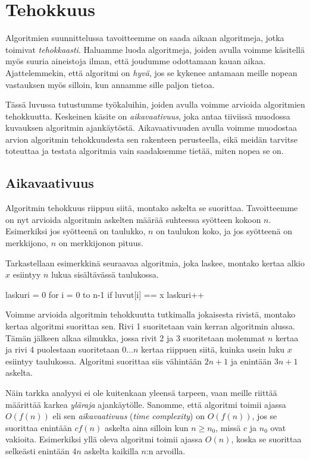 \chapter{Tehokkuus}

Algoritmien suunnittelussa tavoitteemme on saada aikaan
algoritmeja, jotka toimivat \emph{tehokkaasti}.
Haluamme luoda algoritmeja, joiden avulla voimme
käsitellä myös suuria aineistoja ilman, että joudumme
odottamaan kauan aikaa.
Ajattelemmekin, että algoritmi on \emph{hyvä},
jos se kykenee antamaan meille nopean vastauksen myös silloin,
kun annamme sille paljon tietoa.

Tässä luvussa tutustumme työkaluihin, joiden avulla
voimme arvioida algoritmien tehokkuutta.
Keskeinen käsite on \emph{aikavaativuus}, joka antaa
tiiviissä muodossa kuvauksen algoritmin ajankäytöstä.
Aikavaativuuden avulla voimme muodostaa arvion
algoritmin tehokkuudesta sen rakenteen perusteella,
eikä meidän tarvitse toteuttaa ja testata algoritmia
vain saadaksemme tietää, miten nopea se on.

\section{Aikavaativuus}


Algoritmin tehokkuus riippuu siitä, montako askelta se suorittaa.
Tavoitteemme on nyt arvioida algoritmin askelten määrää
suhteessa syötteen kokoon $n$.
Esimerkiksi jos syötteenä on taulukko,
$n$ on taulukon koko,
ja jos syötteenä on merkkijono,
$n$ on merkkijonon pituus.

Tarkastellaan esimerkkinä seuraavaa algoritmia,
joka laskee, montako kertaa alkio $x$ esiintyy
$n$ lukua sisältävässä taulukossa.

\begin{code}[numbers=left]
laskuri = 0
for i = 0 to n-1
    if luvut[i] == x
        laskuri++
\end{code}

Voimme arvioida algoritmin tehokkuutta tutkimalla
jokaisesta rivistä, montako kertaa algoritmi suorittaa sen.
Rivi 1 suoritetaan vain kerran algoritmin alussa.
Tämän jälkeen alkaa silmukka, jossa
rivit 2 ja 3 suoritetaan molemmat $n$ kertaa
ja rivi 4 puolestaan suoritetaan $0 \dots n$
kertaa riippuen siitä, kuinka usein
luku $x$ esiintyy taulukossa.
Algoritmi suorittaa siis vähintään $2n+1$ ja enintään $3n+1$
askelta.


Näin tarkka analyysi ei ole kuitenkaan yleensä tarpeen,
vaan meille riittää määrittää karkea \emph{yläraja} ajankäytölle.
Sanomme, että algoritmi toimii ajassa $O(f(n))$ eli sen
\emph{aikavaativuus} (\emph{time complexity}) on $O(f(n))$, jos se suorittaa
enintään $c f(n)$ askelta aina silloin kun $n \ge n_0$,
missä $c$ ja $n_0$ ovat vakioita.
Esimerkiksi yllä oleva algoritmi toimii ajassa $O(n)$,
koska se suorittaa selkeästi enintään $4n$ askelta
kaikilla $n$:n arvoilla.

